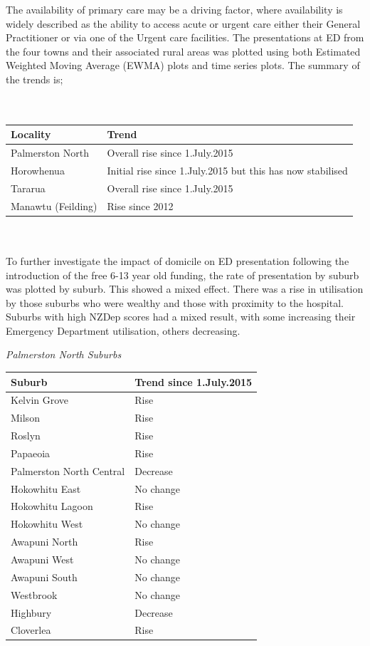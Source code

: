 \documentclass[11pt,a4paper]{article}
\begin{document}
The availability of primary care may be a driving factor, where availability is widely described as the ability to access acute or urgent care either their General Practitioner or via one of the Urgent care facilities. The presentations at ED from the four towns and their associated rural areas was plotted using both Estimated Weighted Moving Average (EWMA) plots and time series plots. The summary of the trends is;\\ 
\\
\\
\begin{tabular}{|l|l|}
\hline 
	Locality & Trend\\
\hline
	Palmerston North & Overall rise since 1.July.2015\\
\hline
	Horowhenua & Initial rise since 1.July.2015 but this has now stabilised\\
\hline
	Tararua & Overall rise since 1.July.2015\\
\hline
	Manawtu (Feilding) & Rise since 2012\\
\hline
\end{tabular}
\\
\\
To further investigate the impact of domicile on ED presentation following the introduction of the free 6-13 year old funding, the rate of presentation by suburb was plotted by suburb. This showed a mixed effect. There was a rise in utilisation by those suburbs who were wealthy and those with proximity to the hospital. Suburbs with high NZDep scores had a mixed result, with some increasing their Emergency Department utilisation, others decreasing.
\pagebreak

\emph{Palmerston North Suburbs}

\begin{tabular}{|l|l|}
\hline
	Suburb & Trend since 1.July.2015\\
\hline
	Kelvin Grove & Rise\\
\hline
	Milson & Rise\\
\hline
	Roslyn & Rise\\
\hline
	Papaeoia & Rise\\
\hline
	Palmerston North Central & Decrease\\
\hline
	Hokowhitu East & No change\\
\hline
	Hokowhitu Lagoon & Rise\\
\hline
	Hokowhitu West & No change\\
\hline
	Awapuni North & Rise\\
\hline
	Awapuni West & No change\\
\hline
	Awapuni South & No change\\
\hline
	Westbrook & No change\\
\hline
	Highbury & Decrease\\
\hline
	Cloverlea & Rise\\
\hline
\end{tabular}
\\
\\
\end{document}
